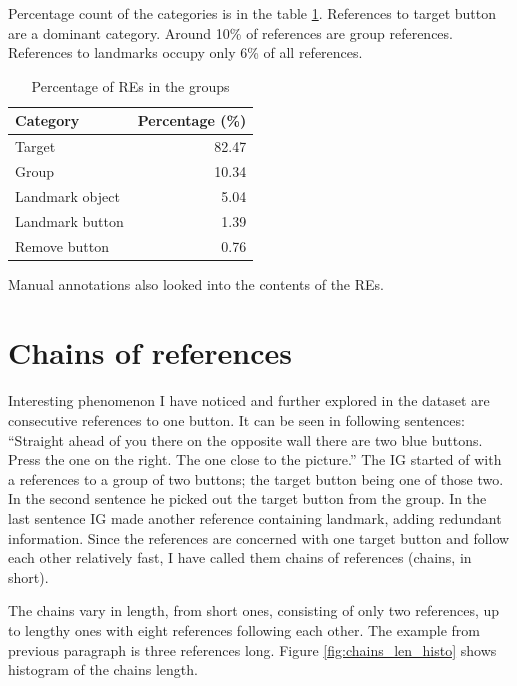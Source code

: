 Percentage count of the categories is in the table \ref{tab:res-groups}. References to target button are a dominant category. Around 10\% of references are group references. References to landmarks occupy only 6\% of all references.

\begin{table}[h!]
\centering
\begin{tabular}{lr}
\toprule
Category  & Percentage (\%)  \\
\midrule
Target   		& 82.47\\
Group 			& 10.34\\
Landmark object 	& 5.04\\
Landmark button	& 1.39\\
Remove button 	& 0.76\\
\bottomrule
\end{tabular}
\caption{Percentage of REs in the groups}
\label{tab:res-groups}
\end{table} 

Manual annotations also looked into the contents of the REs.

\section{Chains of references}
Interesting phenomenon I have noticed and further explored in the dataset are consecutive references to one button. It can be seen in following sentences: ``Straight ahead of you there on the opposite wall there are two blue buttons. Press the one on the right. The one close to the picture.'' The IG started of with a references to a group of two buttons; the target button being one of those two. In the second sentence he picked out the target button from the group. In the last sentence IG made another reference containing landmark, adding redundant information. Since the references are concerned with one target button and follow each other relatively fast, I have called them chains of references (chains, in short).

The chains vary in length, from short ones, consisting of only two references, up to lengthy ones with eight references following each other. The example from previous paragraph is three references long. Figure \ref{fig:chains_len_histo} shows histogram of the chains length.

